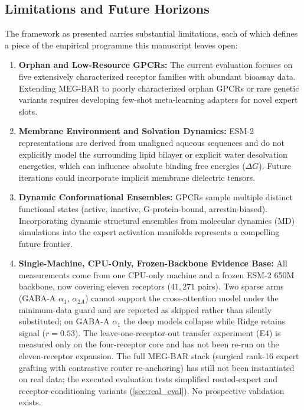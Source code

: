 \documentclass{article}
\theoremstyle{definition}
\begin{document}
\subsection{Limitations and Future Horizons}
The framework as presented carries substantial limitations, each of which defines a piece of the empirical programme this manuscript leaves open:
\begin{enumerate}[leftmargin=1.5em,noitemsep]
    \item \textbf{Orphan and Low-Resource GPCRs:} The current evaluation focuses on five extensively characterized receptor families with abundant bioassay data. Extending MEG-BAR to poorly characterized orphan GPCRs or rare genetic variants requires developing few-shot meta-learning adapters for novel expert slots.
    \item \textbf{Membrane Environment and Solvation Dynamics:} ESM-2 representations are derived from unaligned aqueous sequences and do not explicitly model the surrounding lipid bilayer or explicit water desolvation energetics, which can influence absolute binding free energies ($\Delta G$). Future iterations could incorporate implicit membrane dielectric tensors.
    \item \textbf{Dynamic Conformational Ensembles:} GPCRs sample multiple distinct functional states (active, inactive, G-protein-bound, arrestin-biased). Incorporating dynamic structural ensembles from molecular dynamics (MD) simulations into the expert activation manifolds represents a compelling future frontier.
    \item \textbf{Single-Machine, CPU-Only, Frozen-Backbone Evidence Base:} All measurements come from one CPU-only machine and a frozen ESM-2 650M backbone, now covering eleven receptors ($41{,}271$ pairs). Two sparse arms (GABA-A $\alpha_1$, $\alpha_{2A}$) cannot support the cross-attention model under the minimum-data guard and are reported as skipped rather than silently substituted; on GABA-A $\alpha_1$ the deep models collapse while Ridge retains signal ($r = 0.53$). The leave-one-receptor-out transfer experiment (E4) is measured only on the four-receptor core and has not been re-run on the eleven-receptor expansion. The full MEG-BAR stack (surgical rank-16 expert grafting with contrastive router re-anchoring) has still not been instantiated on real data; the executed evaluation tests simplified routed-expert and receptor-conditioning variants (\cref{sec:real_eval}). No prospective validation exists.
\end{enumerate}
\end{document}
